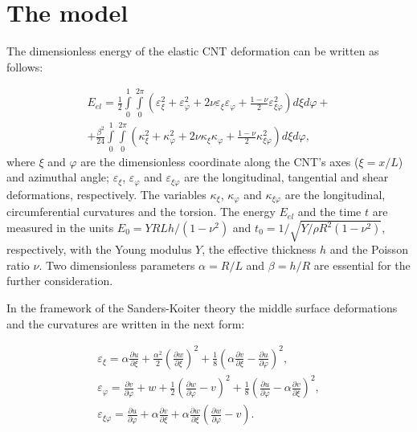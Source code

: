 \section{The model}\label{Model}

The dimensionless energy of the elastic CNT deformation can be written as follows:

\begin{eqnarray}\label{eq:Elastic_en}
E_{el} =\frac{1}{2} \int\limits_{0}^{1} \int\limits_{0}^{2 \pi}\left(\varepsilon_{\xi}^{2} + \varepsilon_{\varphi}^{2} + 2 \nu \varepsilon_{\xi} \varepsilon_{\varphi} + \frac{1 - \nu}{2} \varepsilon_{\xi \varphi}^{2}\right)d\xi d\varphi +\\
+\frac{\beta^{2}}{24} \int\limits_{0}^{1} \int\limits_{0}^{2 \pi}\left(\kappa_{\xi}^{2} + \kappa_{\varphi}^{2} + 2 \nu \kappa_{\xi} \kappa_{\varphi} + \frac{1 - \nu}{2} \kappa_{\xi \varphi}^{2}\right)d\xi d\varphi , \nonumber
\end{eqnarray}
where $\xi$ and $\varphi$ are the dimensionless coordinate along the CNT's axes ($\xi=x/L$) and azimuthal angle; $\varepsilon_{\xi}$, $\varepsilon_{\varphi}$ and $\varepsilon_{\xi\varphi}$ are the longitudinal, tangential and shear deformations, respectively. The variables $\kappa_{\xi}$, $\kappa_{\varphi}$ and $\kappa_{\xi\varphi}$ are the longitudinal, circumferential curvatures  and the torsion. The energy $E_{el}$ and the time $t$ are measured in the units $E_{0}=YRLh/(1-\nu^{2})$ and $t_{0}=1/\sqrt{Y/\rho R^{2}(1-\nu^{2})}$, respectively, with the Young modulus $Y$, the effective thickness $h$ and the Poisson ratio $\nu$. Two dimensionless parameters $\alpha=R/L$ and $\beta=h/R$ are essential for the further consideration.
 
In the framework of the Sanders-Koiter theory the middle surface deformations and the curvatures are written in the next form:

\begin{eqnarray}\label{eq:deformation}
\varepsilon_{\xi} = \alpha \frac{\partial u}{\partial \xi} + \frac{\alpha^{2}}{2}( \frac{\partial w}{\partial \xi})^{2} +\frac{1}{8}(\alpha \frac{\partial v}{\partial \xi}-\frac{\partial u}{\partial \varphi})^{2}, \nonumber \\ 
\varepsilon_{\varphi} = \frac{\partial v}{\partial \varphi} + w + \frac{1}{2} (\frac{\partial w}{\partial \varphi} -v)^{2}+\frac{1}{8}(\frac{\partial u}{\partial \varphi}-\alpha \frac{\partial v}{\partial \xi})^{2},   \\ 
 \varepsilon_{\xi \varphi} = \frac{\partial u}{\partial \varphi} + \alpha \frac{\partial v}{\partial \xi} +\alpha \frac{\partial w}{\partial \xi}(\frac{\partial w}{\partial \varphi}-v).  \nonumber 
\end{eqnarray}

